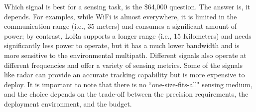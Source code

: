 Which signal is best for a sensing task, is the \$64,000 question. The answer is, it depends. For examples, while WiFi is almost
everywhere, it is limited in the communication range (i.e., 35 meters) and consumes a significant amount of power; by contrast, LoRa
supports a longer range (i.e., 15 Kilometers) and needs significantly less power to operate, but it has a much lower bandwidth and is more
sensitive to the environmental multipath. Different signals also operate at different frequencies and offer a variety of sensing metrics.
Some of the signals like \FMCW radar can provide an accurate tracking capability but is more expensive to deploy. It is important to note
that there is no ``one-size-fits-all" sensing medium, and the choice depends on the trade-off between the precision requirements, the
deployment environment, and the budget.
